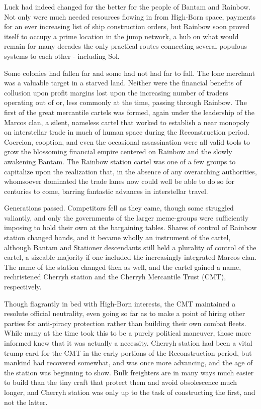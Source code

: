 Luck had indeed changed for the better for the people of Bantam and
Rainbow. Not only were much needed resources flowing in from High-Born
space, payments for an ever increasing list of ship construction
orders, but Rainbow soon proved itself to occupy a prime location in
the jump network, a hub on what would remain for many decades the only
practical routes connecting several populous systems to each other -
including Sol.

Some colonies had fallen far and some had not had far to fall. The
lone merchant was a valuable target in a starved land. Neither were
the financial benefits of collusion upon profit margins lost upon the
increasing number of traders operating out of or, less commonly at the
time, passing through Rainbow. The first of the great mercantile
cartels was formed, again under the leadership of the Marcos clan, a
silent, nameless cartel that worked to establish a near monopoly on
interstellar trade in much of human space during the Reconstruction
period. Coercion, cooption, and even the occasional assassination were
all valid tools to grow the blossoming financial empire centered on
Rainbow and the slowly awakening Bantam. The Rainbow station cartel
was one of a few groups to capitalize upon the realization that, in
the absence of any overarching authorities, whomsoever dominated the
trade lanes now could well be able to do so for centuries to come,
barring fantastic advances in interstellar travel.

Generations passed. Competitors fell as they came, though some
struggled valiantly, and only the governments of the larger
meme-groups were sufficiently imposing to hold their own at the
bargaining tables. Shares of control of Rainbow station changed hands,
and it became wholly an instrument of the cartel, although Bantam and
Stationer descendants still held a plurality of control of the cartel,
a sizeable majority if one included the increasingly integrated Marcos
clan. The name of the station changed then as well, and the cartel
gained a name, rechristened Cherryh station and the Cherryh Mercantile
Trust (CMT), respectively.

Though flagrantly in bed with High-Born interests, the CMT maintained
a resolute official neutrality, even going so far as to make a point
of hiring other parties for anti-piracy protection rather than
building their own combat fleets. While many at the time took this to
be a purely political maneuver, those more informed knew that it was
actually a necessity. Cherryh station had been a vital trump card for
the CMT in the early portions of the Reconstruction period, but
mankind had recovered somewhat, and was once more advancing, and the
age of the station was beginning to show. Bulk freighters are in many
ways much easier to build than the tiny craft that protect them and
avoid obsolescence much longer, and Cherryh station was only up to the
task of constructing the first, and not the latter.

